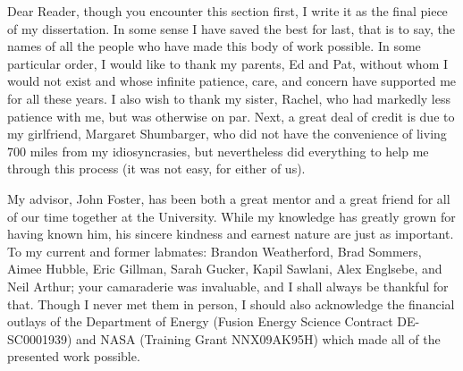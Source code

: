 Dear Reader, though you encounter this section first, I write it as the final
piece of my dissertation. In some sense I have saved the best for last, that is
to say, the names of all the people who have made this body of work possible. In
some particular order, I would like to thank my parents, Ed and Pat, without
whom I would not exist and whose infinite patience, care, and concern have
supported me for all these years. I also wish to thank my sister, Rachel, who
had markedly less patience with me, but was otherwise on par. Next, a great deal
of credit is due to my girlfriend, Margaret Shumbarger, who did not have the
convenience of living 700 miles from my idiosyncrasies, but nevertheless did
everything to help me through this process (it was not easy, for either of us).

My advisor, John Foster, has been both a great mentor and a great friend for all
of our time together at the University. While my knowledge has greatly
grown for having known him, his sincere kindness and earnest nature are just as
important. To my current and former labmates: Brandon Weatherford, Brad
Sommers, Aimee Hubble, Eric Gillman, Sarah Gucker, Kapil Sawlani, Alex Englsebe,
and Neil Arthur; your camaraderie was invaluable, and I shall always be thankful
for that. Though I never met them in person, I should also acknowledge the
financial outlays of the Department of Energy (Fusion Energy Science Contract
DE-SC0001939) and NASA (Training Grant NNX09AK95H) which made all of the
presented work possible.


